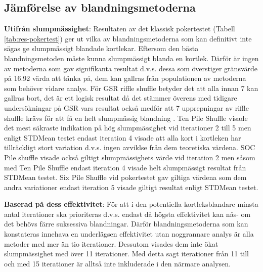\documentclass[swedish,a4paper]{article}
\begin{document}
\subsection{Jämförelse av blandningsmetoderna}
\label{sec:d_bm_jbm}
\textbf{Utifrån slumpmässighet}: Resultaten av det klassisk pokertestet (Tabell
\ref{tab:res-pokertest}) ger ut vilka av blandningsmetoderna som kan definitivt
inte sägas ge slumpmässigt blandade kortlekar.
Eftersom den bästa blandningsmetoden måste kunna slumpmässigt blanda en kortlek.
Därför är ingen av metoderna som gav signifikanta resultat d.v.s. dessa som
överstiger gränsvärde på 16.92 värda att tänka på, dem kan gallras från
populationen av metoderna som behöver vidare analys. För GSR riffle shuffle
betyder det att alla innan 7 kan gallras bort, det är ett logisk resultat då det
stämmer överens med tidigare undersökningar på GSR vars resultat också medför
att 7 upprepningar av riffle shuffle krävs för att få en helt slumpmässig
blandning \parencite{dovetaillair}. Ten Pile Shuffle visade det mest säkraste
indikation på hög slumpmässighet vid iterationer 2 till 5 men enligt
STDMean testet endast iteration 4 visade att alla kort i kortleken har
tillräckligt stort variation d.v.s. ingen avviklse från dem teoretiska värdena.
SOC Pile shuffle visade också giltigt slumpmässighets värde vid iteration 2 men
såsom med Ten Pile Shuffle endast iteration 4 visade helt slumpmässigt resultat
från STDMean testet. Six Pile Shuffle vid pokertestet gav giltiga värdena som
dem andra variationer endast iteration 5 visade giltigt resultat enligt STDMean
testet.  


\textbf{Baserad på dess effektivitet}: För att i
den potentiella kortleksblandare minsta antal iterationer ska prioriteras d.v.s.
endast då högsta effektivitet kan nås- om det behövs färre suksessiva
blandningar. Därför blandningsmetoderna som kan konstateras innehava en
underlägsen effektivitet utan noggrannare analys är alla metoder med mer än tio
iterationer. Dessutom visades dem inte ökat slumpmässighet med över 11
iterationer. Med detta sagt iterationer från 11 till och med 15 iterationer är
alltså inte inkluderade i den närmare analysen.
\end{document}
